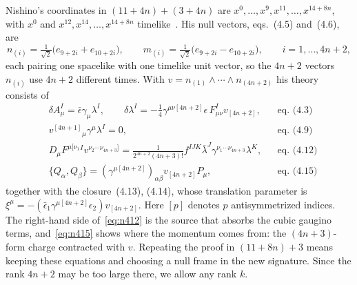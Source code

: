 Nishino's coordinates in $(11+4n)+(3+4n)$ are $x^0,\dots,x^9,x^{11},\dots,x^{14+8n}$, with $x^0$ and $x^{12},x^{14},\dots,x^{14+8n}$ timelike~\cite[eq.~(4.2)]{Nishino1998}. His null vectors, eqs.~(4.5) and~(4.6), are
\begin{equation}
\label{eq:nishinoframe}
n_{(i)}=\tfrac1{\sqrt2}\bigl(e_{9+2i}+e_{10+2i}\bigr),\qquad m_{(i)}=\tfrac1{\sqrt2}\bigl(e_{9+2i}-e_{10+2i}\bigr),\qquad i=1,\dots,4n+2,
\end{equation}
each pairing one spacelike with one timelike unit vector, so the $4n+2$ vectors $n_{(i)}$ use $4n+2$ different times. With $v=n_{(1)}\wedge\cdots\wedge n_{(4n+2)}$ his theory consists of
\begin{align}
&\delta A^I_\mu=\bar\epsilon\gamma_\mu\lambda^I,\qquad \delta\lambda^I=-\tfrac14\gamma^{\mu\nu[4n+2]}\epsilon\,F^I_{\mu\nu}v_{[4n+2]}, && \text{eq.~(4.3)}\label{eq:n43}\\
&v^{[4n+1]}{}_\mu\gamma^\mu\lambda^I=0, && \text{eq.~(4.9)}\label{eq:n49}\\
&D_\mu F^{\mu[\nu_1}{}^I v^{\nu_2\cdots\nu_{4n+3}]}=\tfrac{1}{2^{4n+2}(4n+3)!}f^{IJK}\bar\lambda^J\gamma^{\nu_1\cdots\nu_{4n+3}}\lambda^K, && \text{eq.~(4.12)}\label{eq:n412}\\
&\{Q_\alpha,Q_\beta\}=(\gamma^{\mu[4n+2]})_{\alpha\beta}v_{[4n+2]}P_\mu, && \text{eq.~(4.15)}\label{eq:n415}
\end{align}
together with the closure~(4.13), (4.14), whose translation parameter is $\xi^\mu=-(\bar\epsilon_1\gamma^{\mu[4n+2]}\epsilon_2)v_{[4n+2]}$. Here $[p]$ denotes $p$ antisymmetrized indices. The right-hand side of~\eqref{eq:n412} is the source that absorbs the cubic gaugino terms, and~\eqref{eq:n415} shows where the momentum comes from: the $(4n+3)$-form charge contracted with $v$. Repeating the proof in $(11+8n)+3$ means keeping these equations and choosing a null frame in the new signature. Since the rank $4n+2$ may be too large there, we allow any rank $k$.

